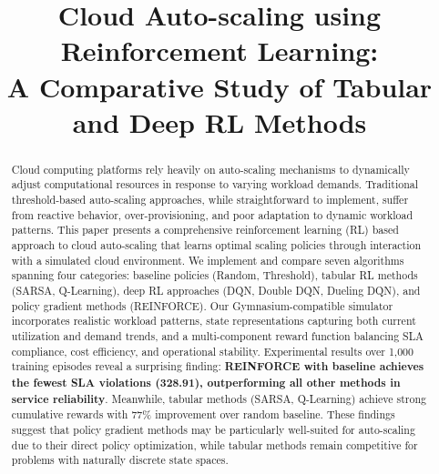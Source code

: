 \documentclass[conference]{IEEEtran}
\begin{document}
\title{Cloud Auto-scaling using Reinforcement Learning:\\
A Comparative Study of Tabular and Deep RL Methods}

\author{
\and
{}
\and
{}
}

\maketitle

\begin{abstract}
Cloud computing platforms rely heavily on auto-scaling mechanisms to dynamically adjust computational resources in response to varying workload demands. Traditional threshold-based auto-scaling approaches, while straightforward to implement, suffer from reactive behavior, over-provisioning, and poor adaptation to dynamic workload patterns. This paper presents a comprehensive reinforcement learning (RL) based approach to cloud auto-scaling that learns optimal scaling policies through interaction with a simulated cloud environment. We implement and compare seven algorithms spanning four categories: baseline policies (Random, Threshold), tabular RL methods (SARSA, Q-Learning), deep RL approaches (DQN, Double DQN, Dueling DQN), and policy gradient methods (REINFORCE). Our Gymnasium-compatible simulator incorporates realistic workload patterns, state representations capturing both current utilization and demand trends, and a multi-component reward function balancing SLA compliance, cost efficiency, and operational stability. Experimental results over 1,000 training episodes reveal a surprising finding: \textbf{REINFORCE with baseline achieves the fewest SLA violations (328.91), outperforming all other methods in service reliability}. Meanwhile, tabular methods (SARSA, Q-Learning) achieve strong cumulative rewards with 77\% improvement over random baseline. These findings suggest that policy gradient methods may be particularly well-suited for auto-scaling due to their direct policy optimization, while tabular methods remain competitive for problems with naturally discrete state spaces.
\end{abstract}
\end{document}
